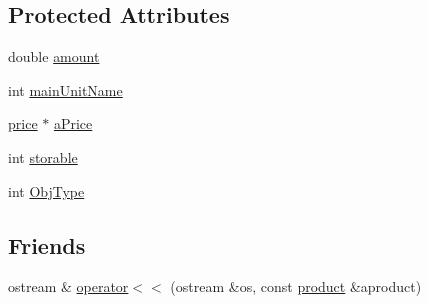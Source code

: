\subsection*{Protected Attributes}
\begin{DoxyCompactItemize}
\item 
double \hyperlink{classproduct_aa3df4db37dfee2a7585a75456c3c361e}{amount}
\item 
int \hyperlink{classproduct_a9627fb5e337066fba10f12d24db748a2}{mainUnitName}
\item 
\hyperlink{classprice}{price} $\ast$ \hyperlink{classproduct_a43ad5c9b57fae8134ea527657068b0b6}{aPrice}
\item 
int \hyperlink{classproduct_af3ced9f7b34320431388728959fc8a18}{storable}
\item 
int \hyperlink{classproduct_ae0b4ae3c238d363f60f145b7dc40804c}{ObjType}
\end{DoxyCompactItemize}
\subsection*{Friends}
\begin{DoxyCompactItemize}
\item 
ostream \& \hyperlink{classproduct_a1b6bf2f2c82a18a17907ee1192fd94bb}{operator$<$$<$} (ostream \&os, const \hyperlink{classproduct}{product} \&aproduct)
\end{DoxyCompactItemize}


